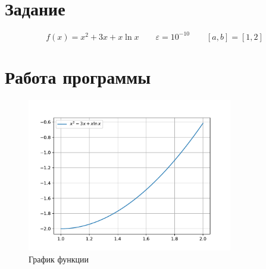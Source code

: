 \section{Задание}
\[ f(x) = x^2 + 3x + x \ln x \qquad \varepsilon = 10^{-10} \qquad [a, b] = [1, 2] \]

\section{Работа программы}
\begin{figure}[H]
  \centering
  \includegraphics[width=0.8\textwidth]{./img/graph.pdf}
  \caption{График функции}
\end{figure}

